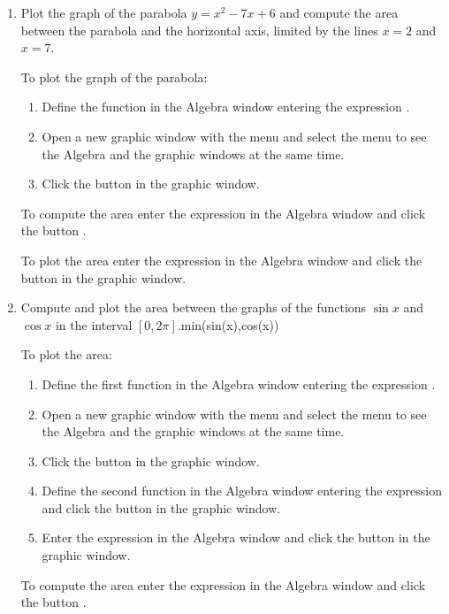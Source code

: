 \begin{enumerate}[leftmargin=*]
\item Plot the graph of the parabola $y=x^2-7x+6$ and compute the area between the parabola and the horizontal axis, limited by the lines $x=2$ and $x=7$.
\begin{indication}
To plot the graph of the parabola:
\begin{enumerate}
\item Define the function in the Algebra window entering the expression .
\item Open a new graphic window with the menu  and select the menu  to see the Algebra and the graphic windows at the same time.
\item Click the button  in the graphic window.
\end{enumerate}
To compute the area enter the expression  in the Algebra window and click the button .

To plot the area enter the expression  in the Algebra window and click the button  in the graphic window.
\end{indication}


\item Compute and plot the area between the graphs of the functions $\sin x$ and $\cos x$ in the interval $[0,2\pi]$.min(sin(x),cos(x))
\begin{indication}
To plot the area:
\begin{enumerate}
\item Define the first function in the Algebra window entering the expression .
\item Open a new graphic window with the menu  and select the menu  to see the Algebra and the graphic windows at the same time.
\item Click the button  in the graphic window.
\item Define the second function in the Algebra window entering the expression  and click the button  in the graphic window.
\item Enter the expression  in the Algebra window and click the button  in the graphic window.
\end{enumerate}
To compute the area enter the expression  in the Algebra window and click the button .
\end{indication}




\end{enumerate}
